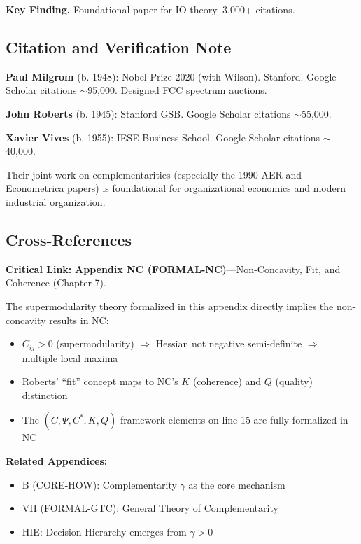 \textbf{Key Finding.}
Foundational paper for IO theory. 3,000+ citations.


\subsection{Citation and Verification Note}

\textbf{Paul Milgrom} (b. 1948): Nobel Prize 2020 (with Wilson). Stanford.
Google Scholar citations $\sim$95,000. Designed FCC spectrum auctions.

\textbf{John Roberts} (b. 1945): Stanford GSB.
Google Scholar citations $\sim$55,000.

\textbf{Xavier Vives} (b. 1955): IESE Business School.
Google Scholar citations $\sim$40,000.

Their joint work on complementarities (especially the 1990 AER and
Econometrica papers) is foundational for organizational economics
and modern industrial organization.

\subsection{Cross-References}

\begin{tcolorbox}[colback=gray!5!white, colframe=gray!50!black]
\textbf{Critical Link:} \textbf{Appendix NC (FORMAL-NC)}---Non-Concavity, Fit, and Coherence (Chapter 7).

The supermodularity theory formalized in this appendix directly implies the non-concavity results in NC:
\begin{itemize}[nosep]
\item $C_{ij} > 0$ (supermodularity) $\Rightarrow$ Hessian not negative semi-definite $\Rightarrow$ multiple local maxima
\item Roberts' ``fit'' concept maps to NC's $K$ (coherence) and $Q$ (quality) distinction
\item The $(C, \Psi, C^*, K, Q)$ framework elements on line 15 are fully formalized in NC
\end{itemize}

\textbf{Related Appendices:}
\begin{itemize}[nosep]
\item B (CORE-HOW): Complementarity $\gamma$ as the core mechanism
\item VII (FORMAL-GTC): General Theory of Complementarity
\item HIE: Decision Hierarchy emerges from $\gamma > 0$
\end{itemize}
\end{tcolorbox}


